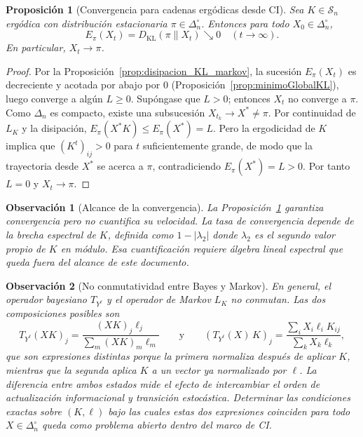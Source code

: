 ﻿\documentclass[12pt]{article}
\newtheorem{proposicion}{Proposición}[section]
\newtheorem{observacion}{Observación}[section]
\begin{document}
\begin{proposicion}[Convergencia para cadenas ergódicas desde CI]\label{prop:convergencia_ergodica}
Sea $K\in\mathcal{S}_n$ ergódica con distribución estacionaria $\pi\in\Delta_n^\circ$. Entonces para todo $X_0\in\Delta_n^\circ$,
\[
E_\pi(X_t) = D_{\mathrm{KL}}(\pi\|X_t) \searrow 0 \quad (t\to\infty).
\]
En particular, $X_t \to \pi$.
\end{proposicion}

\begin{proof}
Por la Proposición~\ref{prop:disipacion_KL_markov}, la sucesión $E_\pi(X_t)$ es decreciente y acotada por abajo por $0$ (Proposición~\ref{prop:minimoGlobalKL}), luego converge a algún $L\ge 0$. Supóngase que $L>0$; entonces $X_t$ no converge a $\pi$. Como $\Delta_n$ es compacto, existe una subsucesión $X_{t_k}\to X^*\neq\pi$. Por continuidad de $L_K$ y la disipación, $E_\pi(X^*K)\le E_\pi(X^*)=L$. Pero la ergodicidad de $K$ implica que $(K^t)_{ij}>0$ para $t$ suficientemente grande, de modo que la trayectoria desde $X^*$ se acerca a $\pi$, contradiciendo $E_\pi(X^*)=L>0$. Por tanto $L=0$ y $X_t\to\pi$.
\end{proof}

\begin{observacion}[Alcance de la convergencia]\label{obs:alcance_convergencia}
La Proposición~\ref{prop:convergencia_ergodica} garantiza convergencia pero no cuantifica su velocidad. La tasa de convergencia depende de la \emph{brecha espectral} de $K$, definida como $1-|\lambda_2|$ donde $\lambda_2$ es el segundo valor propio de $K$ en módulo. Esa cuantificación requiere álgebra lineal espectral que queda fuera del alcance de este documento.
\end{observacion}

\begin{observacion}[No conmutatividad entre Bayes y Markov]\label{obs:no_conmutacion}
En general, el operador bayesiano $T_{Y^\ell}$ y el operador de Markov $L_K$ \emph{no conmutan}. Las dos composiciones posibles son
\[
T_{Y^\ell}(XK)_j = \frac{(XK)_j \ell_j}{\sum_m (XK)_m \ell_m}
\qquad\text{y}\qquad
(T_{Y^\ell}(X)\,K)_j = \frac{\sum_i X_i\ell_i K_{ij}}{\sum_k X_k\ell_k},
\]
que son expresiones distintas porque la primera normaliza \emph{después} de aplicar $K$, mientras que la segunda aplica $K$ a un vector ya normalizado por $\ell$. La diferencia entre ambos estados mide el efecto de intercambiar el orden de actualización informacional y transición estocástica. Determinar las condiciones exactas sobre $(K,\ell)$ bajo las cuales estas dos expresiones coinciden para todo $X\in\Delta_n^\circ$ queda como problema abierto dentro del marco de CI.
\end{observacion}
\end{document}
